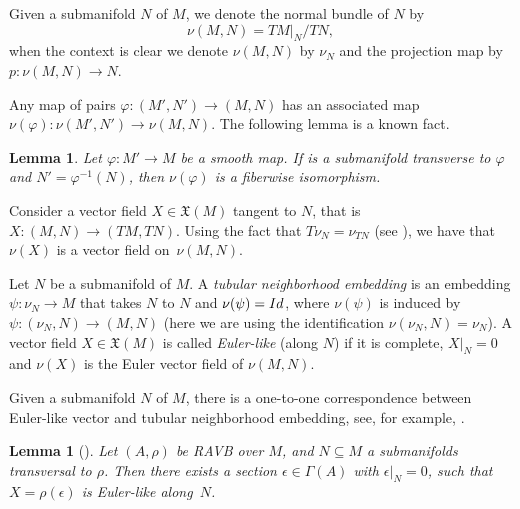\documentclass[11pt]{article}
\numberwithin{equation}{section}
\numberwithin{equation}{section}
\newtheorem{Lemma}[Theorem]{Lemma}
\begin{document}
Given a submanifold $N$ of $M$, we denote the normal bundle of $N$ by
\[\nu(M,N)=TM|_{N}/TN,
\]
 when the context is clear we denote $\nu(M,N)$ by $\nu_N$ and the projection map by $p\colon \nu(M,N)\to N$.

Any map of pairs $\varphi\colon (M',N')\to (M,N)$ has an associated map $\nu(\varphi)\colon \nu(M',N')\to \nu(M,N).$
The following lemma is a known fact.
\begin{Lemma}\label{fiberwise_isom}
Let $\varphi\colon M'\to M$ be a smooth map. If  is a submanifold transverse to $\varphi$ and $N'=\varphi^{-1}(N)$, then $\nu(\varphi)$ is a fiberwise isomorphism.
\end{Lemma}
Consider a vector field $X\in \mathfrak{X}(M)$ tangent to $N$, that is $X\colon (M,N)\to (TM,TN)$. Using the fact that $T\nu_N=\nu_{TN}$ (see \cite[Appendix A]{bursztyn2019splitting}), we have that $\nu(X)$ is a vector field on~$\nu(M,N)$.
\begin{Definition}\label{defTN-EL}
Let $N$ be a submanifold of $M$. A {\em tubular neighborhood embedding} is an embedding
$\psi\colon \nu_N\to M$ that takes $N$ to $N$ and $\nu(\psi)={\rm Id}$, where $\nu(\psi)$ is induced by $\psi\colon (\nu_N,N)\to (M,N)$ (here we are using the identification $\nu(\nu_N,N)=\nu_N$).
A vector field $X\in\mathfrak{X}(M)$ is called {\em Euler-like} (along $N$) if it is complete, $X|_{N}=0$ and $\nu(X)$ is the Euler vector field of $\nu(M,N)$.
\end{Definition}
Given a submanifold $N$ of $M$, there is a one-to-one correspondence between Euler-like vector and tubular neighborhood embedding, see, for example, \cite{bursztyn2019splitting}.
\begin{Lemma}[{\cite[Lemma 3.9]{bursztyn2019splitting}}]\label{existence_esp_section}
Let $(A, \rho)$ be RAVB over $M$, and $N\subseteq M$ a submanifolds transversal to $\rho$.
Then there exists a section $\epsilon\in \Gamma(A)$ with $\epsilon|_N = 0$, such that $X = \rho(\epsilon)$ is Euler-like along~$N$.
\end{Lemma}
\end{document}
